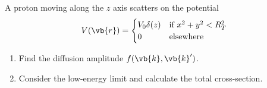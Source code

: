 \newpage
\setcounter{equation}{0}

\begin{esercizio}
   A proton moving along the $z$ axis scatters on the potential
   \begin{equation*}
      V(\vb{r})=
      \begin{cases}
         V_0 \delta(z) & \text{if } x^2 + y^2 < R_T^2\\
         0 & \text{elsewhere}
      \end{cases}
   \end{equation*}
   \begin{enumerate}[label=\alph*), leftmargin=0.6cm]
      \item Find the diffusion amplitude $f(\vb{k},\vb{k}')$.
      \item Consider the low-energy limit and calculate the total cross-section.
   \end{enumerate}
\end{esercizio}
